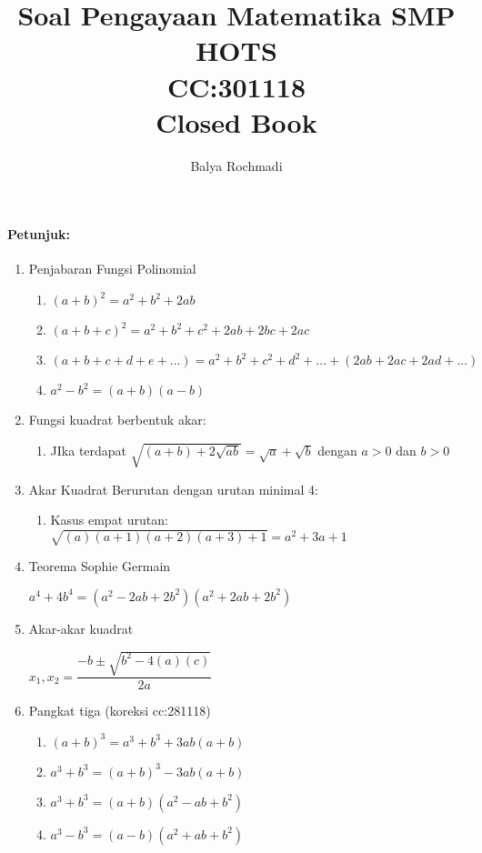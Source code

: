\documentclass[12pt,a4paper,draft,final,oneside,twoside,openright,openany]{article}
\author{Balya Rochmadi}
\title{Soal Pengayaan Matematika SMP HOTS \\CC:301118 \\
	Closed Book}
\begin{document}
		\maketitle
		\Large
		\noindent\makebox[\linewidth]{\rule{\paperwidth}{0.4pt}}
		\paragraph{Petunjuk:}
		\begin{enumerate}
			\item Penjabaran Fungsi Polinomial
			\begin{enumerate}
				\item $(a+b)^2=a^2+b^2+2ab$
				\item $(a+b+c)^2=a^2+b^2+c^2+2ab+2bc+2ac$
				\item $(a+b+c+d+e+...)=a^2+b^2+c^2+d^2+...+(2ab+2ac+2ad+...)$
				\item $a^2-b^2=(a+b)(a-b)$
			\end{enumerate}	
			\item Fungsi kuadrat berbentuk akar:
			\begin{enumerate}
				\item JIka terdapat $\sqrt{(a+b)+2\sqrt{ab}}=\sqrt{a}+\sqrt{b}$ dengan $a>0$ dan $b>0$
			\end{enumerate}
			\item Akar Kuadrat Berurutan dengan urutan minimal 4:
			\begin{enumerate}
				\item Kasus empat urutan:
				$\sqrt{(a)(a+1)(a+2)(a+3)+1}=a^2+3a+1$
			\end{enumerate}
			\item Teorema Sophie Germain 
			\begin{center}
				$a^4+4b^4=(a^2-2ab+2b^2)(a^2+2ab+2b^2)$
			\end{center}
			\item Akar-akar kuadrat
			\begin{center}
				$x_1,x_2=\dfrac{-b \pm \sqrt{b^2-4(a)(c)}}{2a}$
			\end{center}
			\item Pangkat tiga (koreksi cc:281118)
				\begin{enumerate}
					\item $(a+b)^3=a^3+b^3+3ab(a+b)$
					\item $a^3+b^3=(a+b)^3-3ab(a+b)$
					\item $a^3+b^3=(a+b)(a^2-ab+b^2)$
					\item $a^3-b^3=(a-b)(a^2+ab+b^2)$

\end{enumerate}
\end{enumerate}
\end{document}
